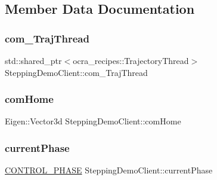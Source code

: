 \subsection{Member Data Documentation}
\hypertarget{classSteppingDemoClient_a9f3d1cdc49cc26a10f9b8fb0d0c68cab}{}\label{classSteppingDemoClient_a9f3d1cdc49cc26a10f9b8fb0d0c68cab} 
\subsubsection{\texorpdfstring{com\+\_\+\+Traj\+Thread}{com\_TrajThread}}
{\footnotesize\ttfamily std\+::shared\+\_\+ptr$<$ocra\+\_\+recipes\+::\+Trajectory\+Thread$>$ Stepping\+Demo\+Client\+::com\+\_\+\+Traj\+Thread\hspace{0.3cm}{\ttfamily [private]}}

\hypertarget{classSteppingDemoClient_aa018c1f2734d63f962be512461c9e010}{}\label{classSteppingDemoClient_aa018c1f2734d63f962be512461c9e010} 
\subsubsection{\texorpdfstring{com\+Home}{comHome}}
{\footnotesize\ttfamily Eigen\+::\+Vector3d Stepping\+Demo\+Client\+::com\+Home\hspace{0.3cm}{\ttfamily [private]}}

\hypertarget{classSteppingDemoClient_afe0aa2a02ea8117d644bf5444a03ac62}{}\label{classSteppingDemoClient_afe0aa2a02ea8117d644bf5444a03ac62} 
\subsubsection{\texorpdfstring{current\+Phase}{currentPhase}}
{\footnotesize\ttfamily \hyperlink{SteppingDemoClient_8h_af2a8507bf21c3ce9b0e67a23381251c6}{C\+O\+N\+T\+R\+O\+L\+\_\+\+P\+H\+A\+SE} Stepping\+Demo\+Client\+::current\+Phase\hspace{0.3cm}{\ttfamily [private]}}

\hypertarget{classSteppingDemoClient_a1bb7d42cf09778349ae1ecd31d2ac116}{}\label{classSteppingDemoClient_a1bb7d42cf09778349ae1ecd31d2ac116} 
